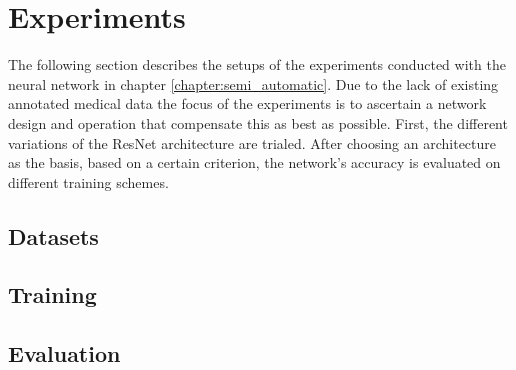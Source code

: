 \chapter{Experiments} \label{chapter:experiments}

The following section describes the setups of the experiments conducted with the neural network in chapter \ref{chapter:semi_automatic}. Due to the lack of existing annotated medical data the focus of the experiments is to ascertain a network design and operation that compensate this as best as possible. First, the different variations of the ResNet \cite{resnet} architecture are trialed. After choosing an architecture as the basis, based on a certain criterion, the network's accuracy is evaluated on different training schemes.

\section{Datasets}



\section{Training}


\section{Evaluation}